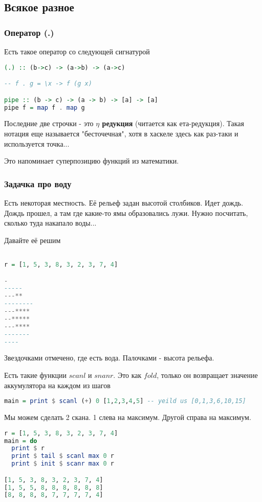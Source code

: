 \documentclass[10pt, a4paper]{article}
\begin{document}
\subsection{Всякое разное}
\subsubsection{Оператор (.)}

Есть такое оператор со следующей сигнатурой
\begin{lstlisting}[language=haskell]
(.) :: (b->c) -> (a->b) -> (a->c)

-- f . g = \x -> f (g x)

pipe :: (b -> c) -> (a -> b) -> [a] -> [a]
pipe f = map f . map g 
\end{lstlisting}

Последние две строчки - это {\bf $\eta$ редукция} (читается как ета-редукция). Такая нотация еще называется "бесточечная", хотя в хаскеле здесь как раз-таки и используется точка...

Это напоминает суперпозицию функций из математики.

\subsubsection{Задачка про воду}
Есть некоторая местность. Её рельеф задан высотой столбиков. Идет дождь. Дождь прошел, а там где какие-то ямы образовались лужи. Нужно посчитать, сколько туда накапало воды...

Давайте её решим

\begin{lstlisting}[language=haskell]

r = [1, 5, 3, 8, 3, 2, 3, 7, 4]

-
-----
---**
--------
---****
--*****
---****
-------
----
\end{lstlisting}
Звездочками отмечено, где есть вода. Палочками - высота рельефа.
 
Есть такие функции $scanl$ и $snanr$. Это как $fold$, только он возвращает значение аккумулятора на каждом из шагов
\begin{lstlisting}[language=haskell]
 main = print $ scanl (+) 0 [1,2,3,4,5] -- yeild us [0,1,3,6,10,15]
\end{lstlisting}

Мы можем сделать 2 скана. 1 слева на максимум. Другой справа на максимум.
\begin{lstlisting}[language=haskell]
r = [1, 5, 3, 8, 3, 2, 3, 7, 4]
main = do
  print $ r
  print $ tail $ scanl max 0 r
  print $ init $ scanr max 0 r

[1, 5, 3, 8, 3, 2, 3, 7, 4]
[1, 5, 5, 8, 8, 8, 8, 8, 8]
[8, 8, 8, 8, 7, 7, 7, 7, 4]
\end{lstlisting}
\end{document}
